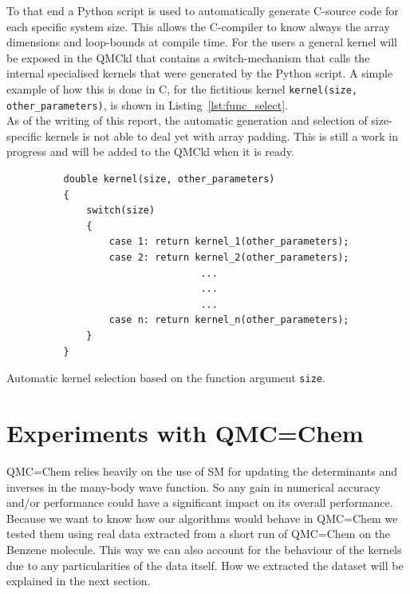 \documentclass[11pt]{article}
\numberwithin{figure}{section}
\numberwithin{table}{section}
\begin{document}
      To that end a Python script is used to automatically generate C-source code for each specific system size. This allows the C-compiler to know always the array dimensions and loop-bounds at compile time. For the users a general kernel will be exposed in the QMCkl that contains a switch-mechanism that calls the internal specialised kernels that were generated by the Python script. A simple example of how this is done in C, for the fictitious kernel \texttt{kernel(size, other\_parameters)}, is shown in Listing~\ref{lst:func_select}.\\
                  
      As of the writing of this report, the automatic generation and selection of size-specific kernels is not able to deal yet with array padding. This is still a work in progress and will be added to the QMCkl when it is ready. 

      \begin{listing}[H]
        \begin{verbatim}
          double kernel(size, other_parameters)
          {
              switch(size)
              {
                  case 1: return kernel_1(other_parameters);
                  case 2: return kernel_2(other_parameters);
                                  ...
                                  ...
                                  ...
                  case n: return kernel_n(other_parameters);
              }
          }
        \end{verbatim}
        \caption{Automatic kernel selection based on the function argument \texttt{size}.}
        \label{lst:func_select}
      \end{listing}
            			
  \section{Experiments with QMC=Chem}
    QMC=Chem relies heavily on the use of SM for updating the determinants and inverses in the many-body wave function. So any gain in numerical accuracy and/or performance could have a significant impact on its overall performance.\\
    
    Because we want to know how our algorithms would behave in QMC=Chem we tested them using real data extracted from a short run of QMC=Chem on the Benzene molecule. This way we can also account for the behaviour of the kernels due to any particularities of the data itself. How we extracted the dataset will be explained in the next section.\\
    
\end{document}

